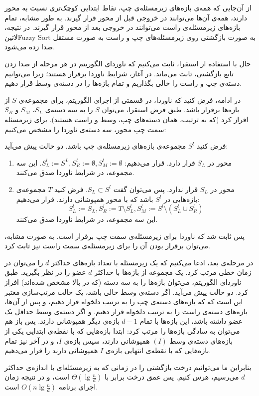 {از آن‌جایی که همه‌ی بازه‌های زیرمسئله‌ی چپ، نقاط ابتدایی کوچک‌‌تری نسبت به محور دارند، همه‌ی آن‌ها می‌توانند در خروجی قبل از محور قرار گیرند. به طور مشابه، تمام بازه‌های زیرمسئله‌ی راست می‌توانند در خروجی بعد از محور قرار گیرند. در نتیجه، ‌لاتین{Fuzzy Sort} به صورت بازگشتی روی زیرمسئله‌های چپ و راست به صورت مستقل صدا زده می‌شود.

حال با استفاده از استقرا، ثابت می‌کنیم که ناوردای الگوریتم در هر مرحله از صدا زدن تابع بازگشتی، ثابت می‌ماند. در آغاز، شرایط ناوردا برقرار هستند؛ زیرا می‌توانیم دسته‌ی چپ و راست را خالی بگذاریم و تمام بازه‌ها را در دسته‌ی وسط قرار دهیم.

در ادامه، فرض کنید که ناوردا، در قسمتی از اجرای الگوریتم، برای مجموعه‌ی $S$ از بازه‌ها برقرار باشد. طبق فرض استقرا، می‌توان $S$ را به سه دسته‌ی $S_L$، $S_M$ و $S_R$ افراز کرد (که به ترتیب، همان دسته‌‌های چپ، وسط و راست هستند). برای زیرمسئله سمت چپ محور، سه دسته‌ی ناوردا را مشخص می‌کنیم:

فرض کنید $S^l$ مجموعه‌ی بازه‌های زیرمسئله‌ی چپ باشد. دو حالت پیش می‌آید:
\begin{enumerate}
	\item محور در $S_L$ قرار دارد. قرار می‌دهیم: $S^l_L:=S^L, S^l_R:=\emptyset, S^l_M:=\emptyset$. این سه مجموعه، در شرایط ناوردا صدق می‌کنند.
	\item محور در $S_L$ قرار ندارد. پس می‌توان گفت $S_L \subset S^l$. فرض کنید $T$ مجموعه‌ی بازه‌هایی در $S^l$ باشد که با محور همپوشانی دارند. قرار می‌دهیم: $$S^l_L:=S_L, S^l_R:=T\setminus S^l_L, S^l_M:=S^l\setminus(S^l_L\cup S^l_R)$$ این سه مجموعه، در شرایط ناوردا صدق می‌کنند.
\end{enumerate}
پس ثابت شد که ناوردا برای زیرمسئله‌ی سمت چپ برقرار است. به صورت مشابه، می‌توان برقرار بودن آن را برای زیرمسئله‌ی سمت راست نیز ثابت کرد.

در مرحله‌ی بعد، ادعا می‌کنیم که یک زیرمسئله با تعداد بازه‌های حداکثر $d$ را می‌توان در زمان خطی مرتب کرد. یک مجموعه از بازه‌ها با حداکثر $d$ عضو را در نظر بگیرید. طبق ناوردای الگوریتم، می‌توان بازه‌ها را به سه دسته (که در بالا مشخص شده‌اند) افراز کرد. دو حالت پیش می‌آید. اگر دسته‌ی وسط خالی باشد، یک حالت مرتب‌سازی معتبر این است که که بازه‌های دسته‌ی چپ را به ترتیب دلخواه قرار دهیم، و پس از آن‌ها، بازه‌های دسته‌ی  راست را به ترتیب دلخواه قرار دهیم. و اگر دسته‌ی وسط حداقل یک عضو داشته باشد، این بازه‌ها با تمام $d-1$ بازه‌ی دیگر همپوشانی دارند. پس باز هم می‌توان به سادگی بازه‌ها را مرتب کرد: ابتدا بازه‌هایی که با نقطه‌ی ابتدایی یکی از بازه‌های دسته‌ی وسط $(I)$ همپوشانی دارند، سپس بازه‌ی $I$، و در آخر نیز تمام بازه‌هایی که با نقطه‌ی انتهایی بازه‌ی $I$ همپوشانی دارند را قرار می‌دهیم.

بنابراین ما می‌توانیم درخت بازگشتی را در زمانی که به زیرمسئله‌ای با اندازه‌ی حداکثر $d$ می‌رسیم، هرس کنیم. پس عمق درخت برابر با $\Theta(\lg \frac{n}{d})$ است، و در نتیجه زمان اجرای برنامه $O(n\lg \frac{n}{d})$ است.


}




